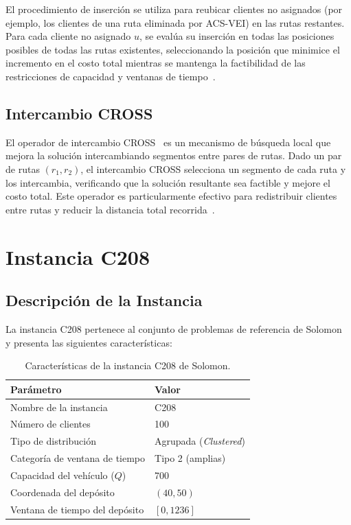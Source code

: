\documentclass[12pt, letterpaper]{article}
\begin{document}
El procedimiento de inserción se utiliza para reubicar clientes no asignados (por ejemplo, los clientes de una ruta eliminada por ACS-VEI) en las rutas restantes. Para cada cliente no asignado $u$, se evalúa su inserción en todas las posiciones posibles de todas las rutas existentes, seleccionando la posición que minimice el incremento en el costo total mientras se mantenga la factibilidad de las restricciones de capacidad y ventanas de tiempo~\cite{gambardella1999, solomon1987}.

\subsection{Intercambio CROSS}
\label{subsec:cross}

El operador de intercambio CROSS~\cite{taillard1997, rochat1995} es un mecanismo de búsqueda local que mejora la solución intercambiando segmentos entre pares de rutas. Dado un par de rutas $(r_1, r_2)$, el intercambio CROSS selecciona un segmento de cada ruta y los intercambia, verificando que la solución resultante sea factible y mejore el costo total. Este operador es particularmente efectivo para redistribuir clientes entre rutas y reducir la distancia total recorrida~\cite{gambardella1999}.

\section{Instancia C208}
\label{sec:instancia_c208}

\subsection{Descripción de la Instancia}
\label{subsec:descripcion_instancia}

La instancia C208 pertenece al conjunto de problemas de referencia de Solomon~\cite{solomon1987} y presenta las siguientes características:

\begin{table}[H]
  \centering
  \caption{Características de la instancia C208 de Solomon.}
  \label{tab:c208_caracteristicas}
  \begin{tabular}{ll}
    \toprule
    \textbf{Parámetro}            & \textbf{Valor} \\
    \midrule
    Nombre de la instancia        & C208 \\
    Número de clientes            & 100 \\
    Tipo de distribución          & Agrupada (\textit{Clustered}) \\
    Categoría de ventana de tiempo & Tipo 2 (amplias) \\
    Capacidad del vehículo ($Q$)  & 700 \\
    Coordenada del depósito       & $(40, 50)$ \\
    Ventana de tiempo del depósito & $[0, 1236]$ \\
    \bottomrule
  \end{tabular}
\end{table}
\end{document}
